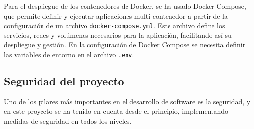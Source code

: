 Para el despliegue de los contenedores de Docker, se ha usado Docker Compose, que permite definir y ejecutar aplicaciones multi-contenedor a partir de la configuración de un archivo \texttt{docker-compose.yml}. Este archivo define los servicios, redes y volúmenes necesarios para la aplicación, facilitando así su despliegue y gestión.
En la configuración de Docker Compose se necesita definir las variables de entorno en el archivo \texttt{.env}.


\subsection{Seguridad del proyecto}
Uno de los pilares más importantes en el desarrollo de software es la seguridad, y en este proyecto se ha tenido en cuenta desde el principio, implementando medidas de seguridad en todos los niveles.

